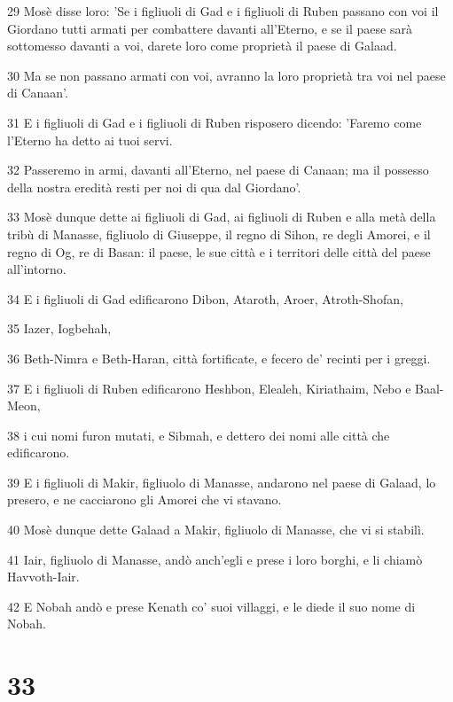 \par 29 Mosè disse loro: 'Se i figliuoli di Gad e i figliuoli di Ruben passano con voi il Giordano tutti armati per combattere davanti all'Eterno, e se il paese sarà sottomesso davanti a voi, darete loro come proprietà il paese di Galaad.
\par 30 Ma se non passano armati con voi, avranno la loro proprietà tra voi nel paese di Canaan'.
\par 31 E i figliuoli di Gad e i figliuoli di Ruben risposero dicendo: 'Faremo come l'Eterno ha detto ai tuoi servi.
\par 32 Passeremo in armi, davanti all'Eterno, nel paese di Canaan; ma il possesso della nostra eredità resti per noi di qua dal Giordano'.
\par 33 Mosè dunque dette ai figliuoli di Gad, ai figliuoli di Ruben e alla metà della tribù di Manasse, figliuolo di Giuseppe, il regno di Sihon, re degli Amorei, e il regno di Og, re di Basan: il paese, le sue città e i territori delle città del paese all'intorno.
\par 34 E i figliuoli di Gad edificarono Dibon, Ataroth, Aroer, Atroth-Shofan,
\par 35 Iazer, Iogbehah,
\par 36 Beth-Nimra e Beth-Haran, città fortificate, e fecero de' recinti per i greggi.
\par 37 E i figliuoli di Ruben edificarono Heshbon, Elealeh, Kiriathaim, Nebo e Baal-Meon,
\par 38 i cui nomi furon mutati, e Sibmah, e dettero dei nomi alle città che edificarono.
\par 39 E i figliuoli di Makir, figliuolo di Manasse, andarono nel paese di Galaad, lo presero, e ne cacciarono gli Amorei che vi stavano.
\par 40 Mosè dunque dette Galaad a Makir, figliuolo di Manasse, che vi si stabilì.
\par 41 Iair, figliuolo di Manasse, andò anch'egli e prese i loro borghi, e li chiamò Havvoth-Iair.
\par 42 E Nobah andò e prese Kenath co' suoi villaggi, e le diede il suo nome di Nobah.

\chapter{33}

